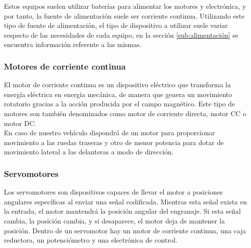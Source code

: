 Estos equipos suelen utilizar baterías para alimentar los motores y electrónica, y por tanto, la fuente de alimentación suele ser corriente continua. Utilizando este tipo de fuente de alimentación, 
el tipo de dispositivo a utilizar suele variar respecto de las necesidades de cada equipo, en la sección \ref{sub:alimentación} se encuentra información referente a las mismas.

\subsubsection{Motores de corriente continua}

El motor de corriente continua es un dispositivo eléctrico que transforma la energía eléctrica en energía mecánica, de manera que genera un movimiento rotatorio gracias a la  
acción producida por el campo magnético. Este tipo de motores son también denominados como motor de corriente directa, motor CC o motor DC.\\

En caso de nuestro vehículo dispondrá de un motor para proporcionar movimiento a las ruedas traseras y otro de menor potencia para dotar de movimiento lateral a las delanteras a modo de dirección.

\subsubsection{Servomotores}

Los servomotores son dispositivos capaces de llevar el motor a posiciones angulares específicas al enviar una señal codificada. Mientras esta señal exista en la entrada, 
el  motor  mantendrá  la  posición  angular  del  engranaje. Si esta señal cambia, la posición cambia, y si desaparece, el motor deja de mantener la posición. Dentro de un servomotor hay un motor de corriente
continua, una caja reductora, un potenciómetro y una electrónica de control.\\

